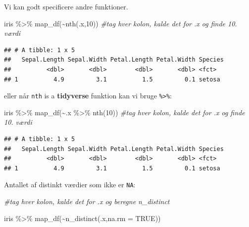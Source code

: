 \documentclass[
]{book}
\newenvironment{Shaded}{\begin{snugshade}}{\end{snugshade}}
\newcommand{\AttributeTok}[1]{\textcolor[rgb]{0.77,0.63,0.00}{#1}}
\newcommand{\CommentTok}[1]{\textcolor[rgb]{0.56,0.35,0.01}{\textit{#1}}}
\newcommand{\ConstantTok}[1]{\textcolor[rgb]{0.00,0.00,0.00}{#1}}
\newcommand{\DecValTok}[1]{\textcolor[rgb]{0.00,0.00,0.81}{#1}}
\newcommand{\FunctionTok}[1]{\textcolor[rgb]{0.00,0.00,0.00}{#1}}
\newcommand{\NormalTok}[1]{#1}
\newcommand{\SpecialCharTok}[1]{\textcolor[rgb]{0.00,0.00,0.00}{#1}}
\begin{document}
Vi kan godt specificere andre funktioner.

\begin{Shaded}
\begin{Highlighting}[]
\NormalTok{iris }\SpecialCharTok{\%\textgreater{}\%}
  \FunctionTok{map\_df}\NormalTok{(}\SpecialCharTok{\textasciitilde{}}\FunctionTok{nth}\NormalTok{(.x,}\DecValTok{10}\NormalTok{)) }\CommentTok{\#tag hver kolon, kalde det for .x og finde 10. værdi}
\end{Highlighting}
\end{Shaded}

\begin{verbatim}
## # A tibble: 1 x 5
##   Sepal.Length Sepal.Width Petal.Length Petal.Width Species
##          <dbl>       <dbl>        <dbl>       <dbl> <fct>  
## 1          4.9         3.1          1.5         0.1 setosa
\end{verbatim}

eller når \texttt{nth} is a \textbf{tidyverse} funktion kan vi bruge \texttt{\%\textgreater{}\%}:

\begin{Shaded}
\begin{Highlighting}[]
\NormalTok{iris }\SpecialCharTok{\%\textgreater{}\%}
  \FunctionTok{map\_df}\NormalTok{(}\SpecialCharTok{\textasciitilde{}}\NormalTok{.x }\SpecialCharTok{\%\textgreater{}\%} \FunctionTok{nth}\NormalTok{(}\DecValTok{10}\NormalTok{)) }\CommentTok{\#tag hver kolon, kalde det for .x og finde 10. værdi}
\end{Highlighting}
\end{Shaded}

\begin{verbatim}
## # A tibble: 1 x 5
##   Sepal.Length Sepal.Width Petal.Length Petal.Width Species
##          <dbl>       <dbl>        <dbl>       <dbl> <fct>  
## 1          4.9         3.1          1.5         0.1 setosa
\end{verbatim}

Antallet af distinkt værdier som ikke er \texttt{NA}:

\begin{Shaded}
\begin{Highlighting}[]
\CommentTok{\#tag hver kolon, kalde det for .x og beregne n\_distinct}

\NormalTok{iris }\SpecialCharTok{\%\textgreater{}\%}
  \FunctionTok{map\_df}\NormalTok{(}\SpecialCharTok{\textasciitilde{}}\FunctionTok{n\_distinct}\NormalTok{(.x,}\AttributeTok{na.rm =} \ConstantTok{TRUE}\NormalTok{))}
\end{Highlighting}
\end{Shaded}
\end{document}

